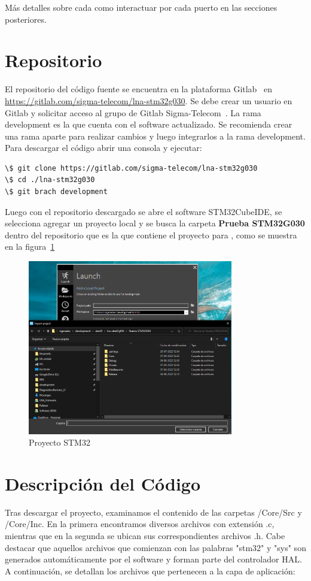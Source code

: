 \documentclass[12pt,twoside,onecolumn]{article}
\begin{document}
Más detalles sobre cada como interactuar por cada puerto en las secciones posteriores.

\section{Repositorio}\label{sec:repo}
El repositorio del código fuente se encuentra en la plataforma Gitlab~\cite{web:gitlab} en \url{https://gitlab.com/sigma-telecom/lna-stm32g030}. Se debe crear un usuario en Gitlab y solicitar acceso al grupo de Gitlab Sigma-Telecom~\cite{web:gitlab-sigma}. La rama development es la que cuenta con el software actualizado. Se recomienda crear una rama aparte para realizar cambios y luego integrarlos a la rama development. Para descargar el código abrir una consola y ejecutar:

\begin{verbatim}
\$ git clone https://gitlab.com/sigma-telecom/lna-stm32g030
\$ cd ./lna-stm32g030
\$ git brach development
\end{verbatim}

Luego con el repositorio descargado se abre el software STM32CubeIDE, se selecciona agregar un proyecto local y se busca la carpeta \textbf{Prueba STM32G030} dentro del repositorio que es la que contiene el proyecto para , como se muestra en la figura~\ref{fig:stm32-fylesystem}
\begin{figure}[H]
  \centering
   \includegraphics[width=0.8\textwidth]{figures/stm32cubeide1.png}
  \caption{Proyecto STM32}
    \label{fig:stm32-fylesystem}
\end{figure}

\newpage
\section{Descripción del Código}
Tras descargar el proyecto, examinamos el contenido de las carpetas /Core/Src y /Core/Inc. En la primera encontramos diversos archivos con extensión .c, mientras que en la segunda se ubican sus correspondientes archivos .h. Cabe destacar que aquellos archivos que comienzan con las palabras "stm32" y "sys" son generados automáticamente por el software y forman parte del controlador HAL. A continuación, se detallan los archivos que pertenecen a la capa de aplicación:
\end{document}
